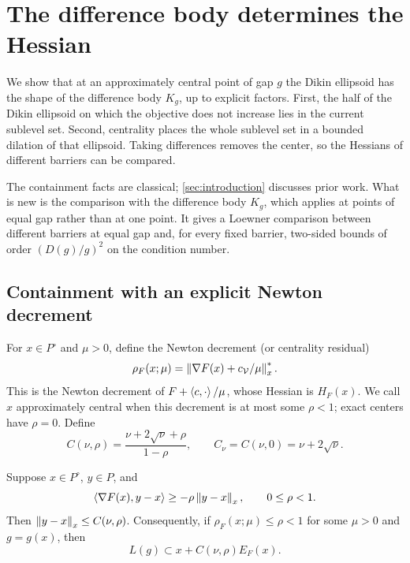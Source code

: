 \section{The difference body determines the Hessian}
\label{sec:geometry}

We show that at an approximately central point of gap $g$ the Dikin
ellipsoid has the shape of the difference body $K_g$, up to explicit
factors. First, the half of the Dikin ellipsoid on which the objective
does not increase lies in the current sublevel set. Second, centrality
places the whole sublevel set in a bounded dilation of that ellipsoid.
Taking differences removes the center, so the Hessians of different
barriers can be compared.

The containment facts are classical; \cref{sec:introduction} discusses
prior work. What is new is the comparison with the difference body
$K_g$, which applies at points of equal gap rather than at one point.
It gives a Loewner comparison between different barriers at equal gap
and, for every fixed barrier, two-sided bounds of order $(D(g)/g)^2$ on
the condition number.

\subsection{Containment with an explicit Newton decrement}

For $x\in P^\circ$ and $\mu>0$, define the Newton decrement (or centrality residual)
\begin{equation}
 \rho_F(x;\mu)=\left\lVert \nabla F(x)+c_{\mathcal V}/\mu\right\rVert_x^*.
 \label{eq:centrality-residual}
\end{equation}
This is the Newton decrement of $F+\left\langle c,\cdot\right\rangle/\mu$, whose Hessian
is $H_F(x)$. We call $x$ approximately central when this decrement is at
most some $\rho<1$; exact centers have $\rho=0$. Define
\begin{equation}
 C(\nu,\rho)=\frac{\nu+2\sqrt\nu+\rho}{1-\rho},
 \qquad C_\nu=C(\nu,0)=\nu+2\sqrt\nu.
 \label{eq:containment-constant}
\end{equation}

\begin{lemma}
\label{lem:approx-containment}
Suppose $x\in P^\circ$, $y\in P$, and
\begin{equation}
 \left\langle \nabla F(x),y-x\right\rangle\geq-\rho\left\lVert y-x\right\rVert_x,
 \qquad 0\leq\rho<1.
 \label{eq:one-sided-gradient}
\end{equation}
Then $\left\lVert y-x\right\rVert_x\leq C(\nu,\rho)$. Consequently, if
$\rho_F(x;\mu)\leq\rho<1$ for some $\mu>0$ and $g=g(x)$, then
\begin{equation}
 L(g)\subset x+C(\nu,\rho)E_F(x).
 \label{eq:sublevel-containment}
\end{equation}
\end{lemma}

